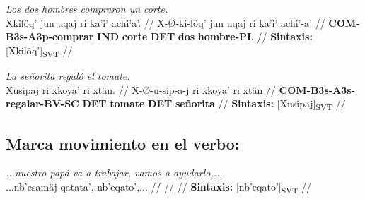 \documentclass{article}%
\begin{document}
%
\par\medskip%
\ex
\textit{Los dos hombres compraron un corte.} \\
\begingl
\gla Xkilöq' jun uqaj ri ka'i' achi'a'. //
\glb X-Ø-ki-löq' jun uqaj ri ka'i' achi'-a' //
\glc \textbf{COM-}\textbf{B3s-}\textbf{A3p-}\textbf{comprar} \textbf{IND} \textbf{corte} \textbf{DET} \textbf{dos} \textbf{hombre-}\textbf{PL} //
\glft \textbf{Sintaxis:} [Xkilöq']\textsubscript{SVT} //
\endgl
\xe
%
\medskip%
\par\medskip%
\ex
\textit{La señorita regaló el tomate.} \\
\begingl
\gla Xusipaj ri xkoya' ri xtän. //
\glb X-Ø-u-sip-a-j ri xkoya' ri xtän //
\glc \textbf{COM-}\textbf{B3s-}\textbf{A3s-}\textbf{regalar-}\textbf{BV-}\textbf{SC} \textbf{DET} \textbf{tomate} \textbf{DET} \textbf{señorita} //
\glft \textbf{Sintaxis:} [Xusipaj]\textsubscript{SVT} //
\endgl
\xe
%
\medskip%
\subsection{Marca movimiento en el verbo:}%
\label{subsec:Marcamovimientoenelverbo}%

%
\par\medskip%
\ex
\textit{...nuestro papá va a trabajar, vamos a ayudarlo,...} \\
\begingl
\gla ...nb'esamäj qatata', nb'eqato',... //
\glb  //
\glc  //
\glft \textbf{Sintaxis:} [nb'eqato']\textsubscript{SVT} //
\endgl
\xe
%
\medskip

%
\end{document}
